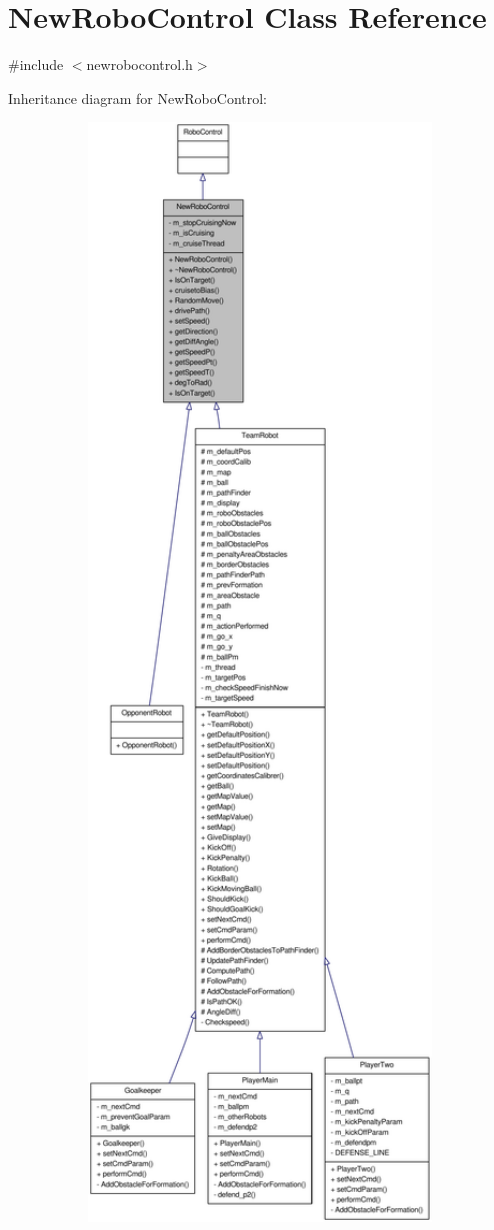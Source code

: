 \hypertarget{classNewRoboControl}{
\section{NewRoboControl Class Reference}
\label{classNewRoboControl}
}


{\ttfamily \#include $<$newrobocontrol.h$>$}



Inheritance diagram for NewRoboControl:\nopagebreak
\begin{figure}[H]
\begin{center}
\leavevmode
\includegraphics[width=400pt]{classNewRoboControl__inherit__graph}
\end{center}
\end{figure}
